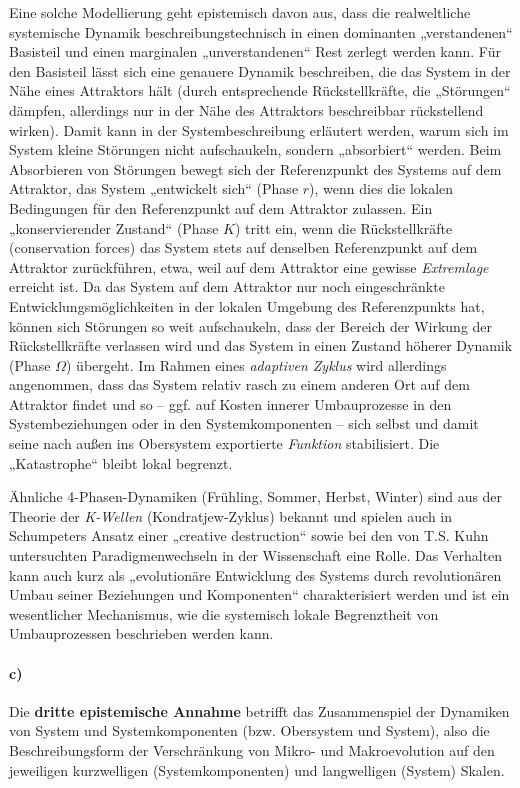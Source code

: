 \documentclass[11pt,a4paper]{article}
\begin{document}
Eine solche Modellierung geht epistemisch davon aus, dass die realweltliche
systemische Dynamik beschreibungstechnisch in einen dominanten „verstandenen“
Basisteil und einen marginalen „unverstandenen“ Rest zerlegt werden kann. Für
den Basisteil lässt sich eine genauere Dynamik beschreiben, die das System in
der Nähe eines Attraktors hält (durch entsprechende Rückstellkräfte, die
„Störungen“ dämpfen, allerdings nur in der Nähe des Attraktors beschreibbar
rückstellend wirken). Damit kann in der Systembeschreibung erläutert werden,
warum sich im System kleine Störungen nicht aufschaukeln, sondern „absorbiert“
werden. Beim Absorbieren von Störungen bewegt sich der Referenzpunkt des
Systems auf dem Attraktor, das System „entwickelt sich“ (Phase $r$), wenn dies
die lokalen Bedingungen für den Referenzpunkt auf dem Attraktor zulassen. Ein
„konservierender Zustand“ (Phase $K$) tritt ein, wenn die Rückstellkräfte
(conservation forces) das System stets auf denselben Referenzpunkt auf dem
Attraktor zurückführen, etwa, weil auf dem Attraktor eine gewisse
\emph{Extremlage} erreicht ist. Da das System auf dem Attraktor nur noch
eingeschränkte Entwicklungsmöglichkeiten in der lokalen Umgebung des
Referenzpunkts hat, können sich Störungen so weit aufschaukeln, dass der
Bereich der Wirkung der Rückstellkräfte verlassen wird und das System in einen
Zustand höherer Dynamik (Phase $\Omega$) übergeht. Im Rahmen eines
\emph{adaptiven Zyklus} wird allerdings angenommen, dass das System relativ
rasch zu einem anderen Ort auf dem Attraktor findet und so -- ggf. auf Kosten
innerer Umbauprozesse in den Systembeziehungen oder in den Systemkomponenten
-- sich selbst und damit seine nach außen ins Obersystem exportierte
\emph{Funktion} stabilisiert. Die „Katastrophe“ bleibt lokal begrenzt.

Ähnliche 4-Phasen-Dynamiken (Frühling, Sommer, Herbst, Winter) sind aus der
Theorie der \emph{K-Wellen} (Kondratjew-Zyklus) bekannt und spielen auch in
Schumpeters Ansatz einer „creative destruction“ sowie bei den von T.S. Kuhn
untersuchten Paradigmenwechseln in der Wissenschaft eine Rolle. Das Verhalten
kann auch kurz als „evolutionäre Entwicklung des Systems durch revolutionären
Umbau seiner Beziehungen und Komponenten“ charakterisiert werden und ist ein
wesentlicher Mechanismus, wie die systemisch lokale Begrenztheit von
Umbauprozessen beschrieben werden kann.

\paragraph{c)}
Die \textbf{dritte epistemische Annahme} betrifft das Zusammenspiel der
Dynamiken von System und Systemkomponenten (bzw.  Obersystem und System), also
die Beschreibungsform der Verschränkung von Mikro- und Makroevolution auf den
jeweiligen kurzwelligen (Systemkomponenten) und langwelligen (System) Skalen.
\end{document}
